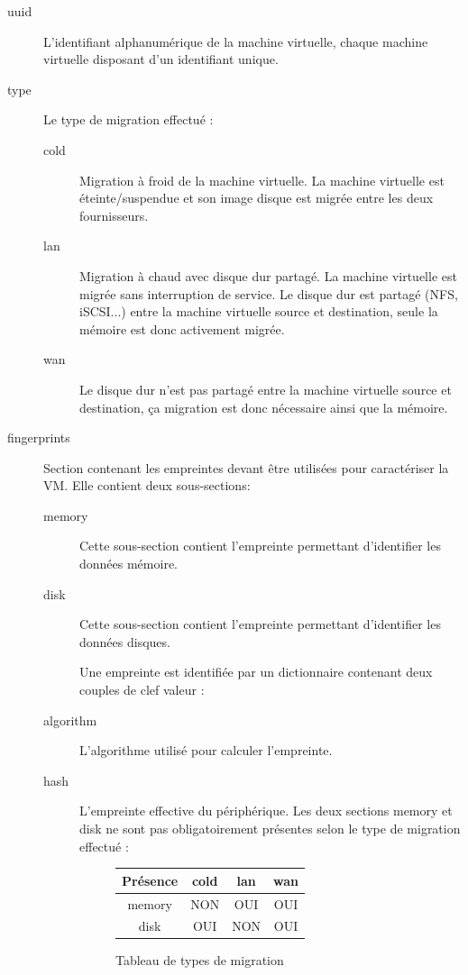 \begin{description}
    \item[uuid]  L’identifiant alphanumérique de la machine virtuelle, chaque machine
    virtuelle disposant d’un identifiant unique.
    \item[type] Le type de migration effectué :
    \begin{description}
        \item[cold] Migration à froid de la machine virtuelle. La machine virtuelle est
        éteinte/suspendue et son image disque est migrée entre les deux fournisseurs.
        \item[lan] Migration à chaud avec disque dur partagé. La machine virtuelle
        est migrée sans interruption de service. Le disque dur est partagé
        (NFS, iSCSI...) entre la machine virtuelle source et destination, seule
        la mémoire est donc activement migrée.
        \item[wan] Le disque dur n'est pas partagé entre la machine virtuelle source et destination, ça migration est donc nécessaire ainsi que la mémoire.
    \end{description} 
    \item[fingerprints] Section contenant les empreintes devant être utilisées pour caractériser la VM. Elle contient deux sous-sections:
    \begin{description}
        \item[memory] Cette sous-section contient l’empreinte permettant d’identifier
        les données mémoire.
        
        \item[disk] Cette sous-section contient l’empreinte permettant d’identifier les
        données disques.

        Une empreinte est identifiée par un dictionnaire contenant deux couples de clef valeur :
        \item[algorithm] L’algorithme utilisé pour calculer l’empreinte.
        \item[hash]  L’empreinte effective du périphérique.
        Les deux sections memory et disk ne sont pas obligatoirement présentes selon le type de migration effectué :

        \begin{figure}[H]
            \centering
            \begin{tabular}{|c | c | c | c |} 
                \hline
                Présence & cold & lan & wan \\ 
                \hline
                memory & NON & OUI & OUI \\ \hline
                disk & OUI & NON & OUI \\ \hline
            \end{tabular}
            \caption{Tableau de types de migration}
        \end{figure}


\end{description}
\end{description}
